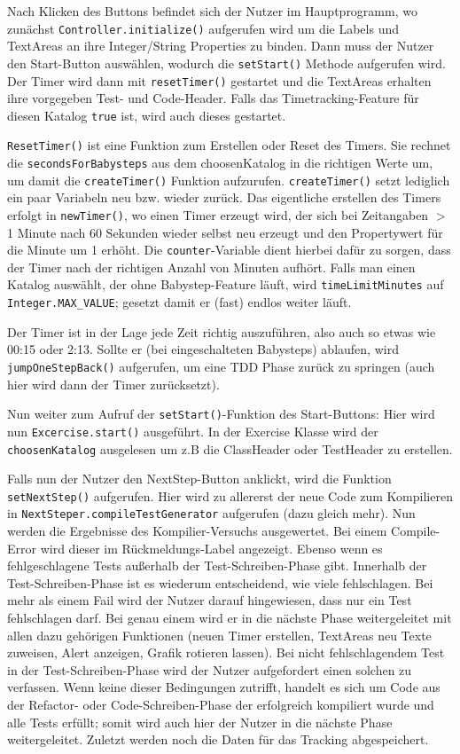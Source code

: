 \documentclass[10pt]{article}
\begin{document}
Nach Klicken des Buttons befindet sich der Nutzer im Hauptprogramm, wo zunächst \verb+Controller.initialize()+  aufgerufen wird um die Labels und TextAreas an ihre Integer/String Properties zu binden. Dann muss der Nutzer den Start-Button auswählen, wodurch die \verb+setStart()+ Methode aufgerufen wird. Der Timer wird dann mit \verb+resetTimer()+ gestartet und die TextAreas erhalten ihre vorgegeben Test- und Code-Header. Falls das Timetracking-Feature für diesen Katalog \verb+true+ ist, wird auch dieses gestartet.

\verb+ResetTimer()+ ist eine Funktion zum Erstellen oder Reset des Timers. Sie rechnet die \verb+secondsForBabysteps+ aus dem choosenKatalog in die richtigen Werte um, um damit die \verb+createTimer()+ Funktion aufzurufen. \verb+createTimer()+ setzt lediglich ein paar Variabeln neu bzw. wieder zurück. Das eigentliche erstellen des Timers erfolgt in \verb+newTimer()+, wo einen Timer erzeugt wird, der sich bei Zeitangaben $>$ 1 Minute nach 60 Sekunden wieder selbst neu erzeugt und den Propertywert für die Minute um 1 erhöht. Die \verb+counter+-Variable dient hierbei dafür zu sorgen, dass der Timer nach der richtigen Anzahl von Minuten aufhört. 
Falls man einen Katalog auswählt, der ohne Babystep-Feature läuft, wird \verb+timeLimitMinutes+ auf \verb+Integer.MAX_VALUE+; gesetzt damit er (fast) endlos weiter läuft.

Der Timer ist in der Lage jede Zeit richtig auszuführen, also auch so etwas wie 00:15 oder 2:13.
Sollte er (bei eingeschalteten Babysteps) ablaufen, wird \verb+jumpOneStepBack()+ aufgerufen, um eine TDD Phase zurück zu springen (auch hier wird dann der Timer zurücksetzt).

Nun weiter zum Aufruf der \verb+setStart()+-Funktion des Start-Buttons: Hier wird nun \verb+Excercise.start()+ ausgeführt. In der Exercise Klasse wird der \linebreak \verb+choosenKatalog+ ausgelesen um z.B die ClassHeader oder TestHeader zu erstellen.

Falls nun der Nutzer den NextStep-Button anklickt, wird die Funktion \linebreak \verb+setNextStep()+ aufgerufen.
Hier wird zu allererst der neue Code zum Kompilieren in \verb+NextSteper.compileTestGenerator+ aufgerufen (dazu gleich mehr). Nun werden die Ergebnisse des Kompilier-Versuchs ausgewertet. Bei einem Compile-Error wird dieser im Rückmeldungs-Label angezeigt. Ebenso wenn es fehlgeschlagene Tests außerhalb der Test-Schreiben-Phase gibt. Innerhalb der Test-Schreiben-Phase ist es wiederum entscheidend, wie viele fehlschlagen. Bei mehr als einem Fail wird der Nutzer darauf hingewiesen, dass nur ein Test fehlschlagen darf. Bei genau einem wird er in die nächste Phase weitergeleitet mit allen dazu gehörigen Funktionen (neuen Timer erstellen,  TextAreas neu Texte zuweisen, Alert anzeigen, Grafik rotieren lassen).
Bei nicht fehlschlagendem Test in der Test-Schreiben-Phase wird der Nutzer aufgefordert einen solchen zu verfassen.
Wenn keine dieser Bedingungen zutrifft, handelt es sich um Code aus der Refactor- oder Code-Schreiben-Phase der erfolgreich kompiliert wurde und alle Tests erfüllt; somit wird auch hier der Nutzer in die nächste Phase weitergeleitet.
Zuletzt werden noch die Daten für das Tracking abgespeichert.
\end{document}
